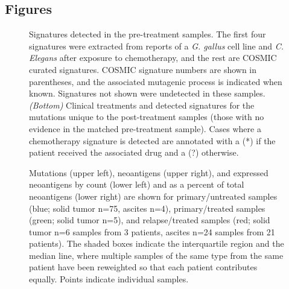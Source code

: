 \documentclass[linenumbers]{bmcart}
\begin{document}
\begin{backmatter}



\section*{Figures}

\begin{figure}[h!]
  \caption{
      Signatures detected in the pre-treatment samples. The first four signatures were extracted from reports of a \textit{G. gallus} cell line and \textit{C. Elegans} after exposure to chemotherapy, and the rest are COSMIC curated signatures. COSMIC signature numbers are shown in parentheses, and the associated mutagenic process is indicated when known. Signatures not shown were undetected in these samples. \textit{(Bottom)} Clinical treatments and detected signatures for the mutations unique to the post-treatment samples (those with no evidence in the matched pre-treatment sample). Cases where a chemotherapy signature is detected are annotated with a (*) if the patient received the associated drug and a (?) otherwise.}
      \end{figure}

  \begin{figure}[h!]
  \caption{
      Mutations (upper left), neoantigens (upper right), and expressed neoantigens by count (lower left) and as a percent of total neoantigens (lower right) are shown for primary/untreated samples (blue; solid tumor n=75, ascites n=4), primary/treated samples (green; solid tumor n=5), and relapse/treated samples (red; solid tumor n=6 samples from 3 patients, ascites n=24 samples from 21 patients). The shaded boxes indicate the interquartile region and the median line, where multiple samples of the same type from the same patient have been reweighted so that each patient contributes equally. Points indicate individual samples.}
      \end{figure}
      

\end{backmatter}
\end{document}
